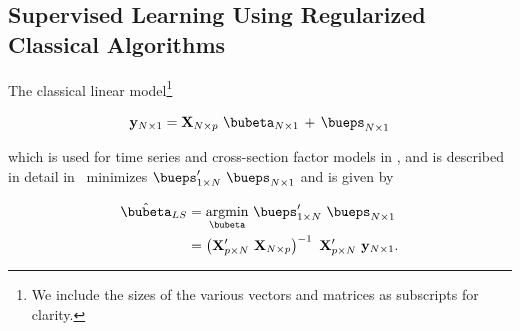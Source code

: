 \documentclass[graybox,envcountchap,sectrefs]{svmono}\usepackage[]{graphicx}\usepackage[]{xcolor}
\begin{document}
\begin{appendices}
\section{Supervised Learning Using Regularized Classical Algorithms\label{sec:ClassicalSupervisedLearning}}

The classical linear model\footnote{We include the sizes of the various vectors and matrices as subscripts
for clarity.}

\begin{equation}
\mathrm{\mathbf{y}}_{N\times1}=\mathrm{\mathbf{X}}_{N\times p}\ \bubeta_{N\times1}\,+\,\bueps_{N\times1}\label{eq:OLS1}
\end{equation}

which is used for time series and cross-section factor models in \FactorModelsChapters,
and is described in detail in \ProbabilityAppendix\ minimizes $\bueps_{1\times N}^{\prime}\ \bueps_{N\times1}$
and is given by

\begin{align}
\hat{\bubeta}_{LS} & =\underset{\bubeta}{\mathrm{argmin}}\ \bueps_{1\times N}^{\prime}\ \bueps_{N\times1}\nonumber \\
 & =\left(\mathrm{\mathbf{X}}_{p\times N}^{\prime}\ \mathrm{\mathbf{X}}_{N\times p}\right)^{-1}\ \mathrm{\mathbf{X}}_{p\times N}^{\prime}\ \mathrm{\mathbf{y}}_{N\times1}.\label{eq:OLS2}
\end{align}

 


\end{appendices}
\end{document}
